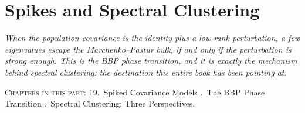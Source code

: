 \part{Spikes and Spectral Clustering}

\begin{fullwidth}
\noindent\textit{When the population covariance is the identity plus a low-rank perturbation, a few eigenvalues escape the Marchenko--Pastur bulk, if and only if the perturbation is strong enough. This is the BBP phase transition, and it is exactly the mechanism behind \emph{spectral clustering}: the destination this entire book has been pointing at.}

\medskip
\noindent\textsc{Chapters in this part:} 19.~Spiked Covariance Models .~The BBP Phase Transition .~Spectral Clustering: Three Perspectives.
\end{fullwidth}
